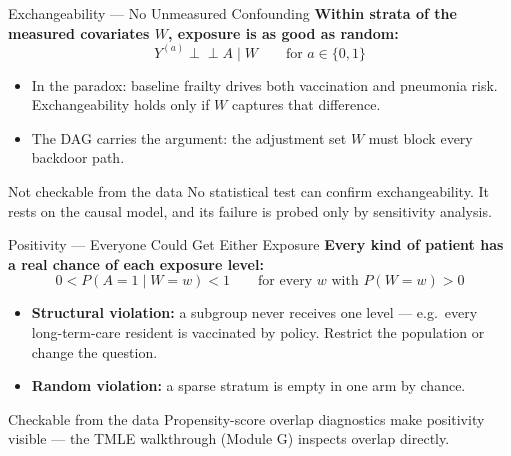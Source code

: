 \documentclass[aspectratio=169]{beamer}
\newcommand{\indep}{\perp\!\!\!\perp}
\begin{document}
\begin{frame}{Exchangeability --- No Unmeasured Confounding}
  \small
  \textbf{Within strata of the measured covariates \(W\), exposure is as
  good as random:}
  \[
    Y^{(a)} \indep A \mid W \qquad \text{for } a \in \{0,1\}
  \]
  \begin{itemize}
    \item In the paradox: baseline frailty drives both vaccination and
      pneumonia risk. Exchangeability holds only if \(W\) captures that
      difference.
    \item The DAG carries the argument: the adjustment set \(W\) must
      block every backdoor path.
  \end{itemize}
  \vspace{0.4em}

  \begin{block}{\textcolor{brick}{Not checkable from the data}}
    No statistical test can confirm exchangeability. It rests on the
    causal model, and its failure is probed only by sensitivity
    analysis.
  \end{block}
\end{frame}

\begin{frame}{Positivity --- Everyone Could Get Either Exposure}
  \small
  \textbf{Every kind of patient has a real chance of each exposure level:}
  \[
    0 < P(A = 1 \mid W = w) < 1
    \qquad \text{for every } w \text{ with } P(W=w) > 0
  \]
  \begin{itemize}
    \item \textbf{Structural violation:} a subgroup never receives one
      level --- e.g.\ every long-term-care resident is vaccinated by
      policy. Restrict the population or change the question.
    \item \textbf{Random violation:} a sparse stratum is empty in one
      arm by chance.
  \end{itemize}
  \vspace{0.4em}

  \begin{block}{\textcolor{good}{Checkable from the data}}
    Propensity-score overlap diagnostics make positivity visible --- the
    TMLE walkthrough (Module G) inspects overlap directly.
  \end{block}
\end{frame}
\end{document}
